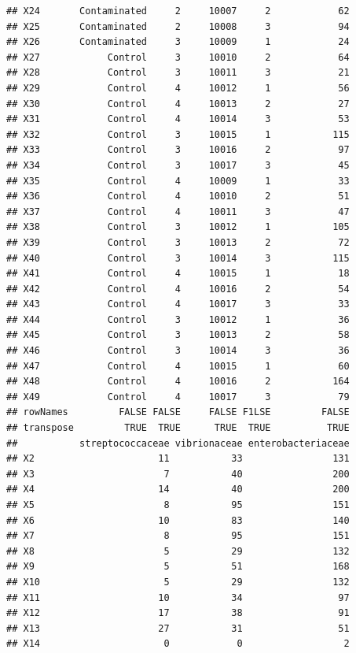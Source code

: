 \documentclass[12pt]{beamer}\usepackage[]{graphicx}\usepackage[]{color}
\makeatletter
\newenvironment{kframe}{%
 \def\at@end@of@kframe{}%
 \ifinner\ifhmode%
  \def\at@end@of@kframe{\end{minipage}}%
  \begin{minipage}{\columnwidth}%
 \fi\fi%
 \def\FrameCommand##1{\hskip\@totalleftmargin \hskip-\fboxsep
 \colorbox{shadecolor}{##1}\hskip-\fboxsep
     \hskip-\linewidth \hskip-\@totalleftmargin \hskip\columnwidth}%
 \MakeFramed {\advance\hsize-\width
   \@totalleftmargin\z@ \linewidth\hsize
   \@setminipage}}%
 {\par\unskip\endMakeFramed%
 \at@end@of@kframe}
\newenvironment{knitrout}{}{} %
\makeatother
\begin{document}
\begin{frame}[fragile]
\begin{knitrout}
\begin{kframe}
\begin{verbatim}
## X24       Contaminated     2     10007     2            62
## X25       Contaminated     2     10008     3            94
## X26       Contaminated     3     10009     1            24
## X27            Control     3     10010     2            64
## X28            Control     3     10011     3            21
## X29            Control     4     10012     1            56
## X30            Control     4     10013     2            27
## X31            Control     4     10014     3            53
## X32            Control     3     10015     1           115
## X33            Control     3     10016     2            97
## X34            Control     3     10017     3            45
## X35            Control     4     10009     1            33
## X36            Control     4     10010     2            51
## X37            Control     4     10011     3            47
## X38            Control     3     10012     1           105
## X39            Control     3     10013     2            72
## X40            Control     3     10014     3           115
## X41            Control     4     10015     1            18
## X42            Control     4     10016     2            54
## X43            Control     4     10017     3            33
## X44            Control     3     10012     1            36
## X45            Control     3     10013     2            58
## X46            Control     3     10014     3            36
## X47            Control     4     10015     1            60
## X48            Control     4     10016     2           164
## X49            Control     4     10017     3            79
## rowNames         FALSE FALSE     FALSE F1LSE         FALSE
## transpose         TRUE  TRUE      TRUE  TRUE          TRUE
##           streptococcaceae vibrionaceae enterobacteriaceae
## X2                      11           33                131
## X3                       7           40                200
## X4                      14           40                200
## X5                       8           95                151
## X6                      10           83                140
## X7                       8           95                151
## X8                       5           29                132
## X9                       5           51                168
## X10                      5           29                132
## X11                     10           34                 97
## X12                     17           38                 91
## X13                     27           31                 51
## X14                      0            0                  2

\end{verbatim}
\end{kframe}
\end{knitrout}
\end{frame}
\end{document}
